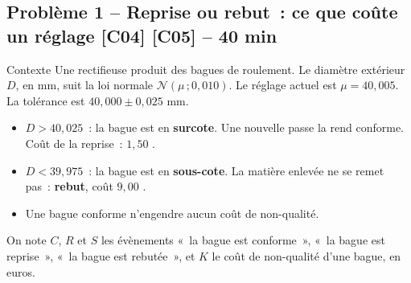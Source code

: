 \documentclass[a4paper,11pt]{article}
\newcommand{\duree}[1]{\hfill{\normalsize\color{uimmred}#1}}
\begin{document}
\subsection{Problème 1 -- Reprise ou rebut~: ce que coûte un réglage \duree{[C04] [C05] -- 40 min}}

\begin{exo}{Contexte}
Une rectifieuse produit des bagues de roulement. Le diamètre extérieur $D$, en mm, suit la loi normale $\mathcal{N}(\mu\,;0{,}010)$. Le réglage actuel est $\mu = 40{,}005$. La tolérance est $40{,}000 \pm 0{,}025$ mm.
\begin{itemize}[leftmargin=12pt, itemsep=1pt, topsep=3pt]
  \item $D > 40{,}025$~: la bague est en \textbf{surcote}. Une nouvelle passe la rend conforme. Coût de la reprise~: $1{,}50$ \texteuro.
  \item $D < 39{,}975$~: la bague est en \textbf{sous-cote}. La matière enlevée ne se remet pas~: \textbf{rebut}, coût $9{,}00$ \texteuro.
  \item Une bague conforme n'engendre aucun coût de non-qualité.
\end{itemize}
On note $C$, $R$ et $S$ les évènements «~la bague est conforme~», «~la bague est reprise~», «~la bague est rebutée~», et $K$ le coût de non-qualité d'une bague, en euros.
\end{exo}
\end{document}
